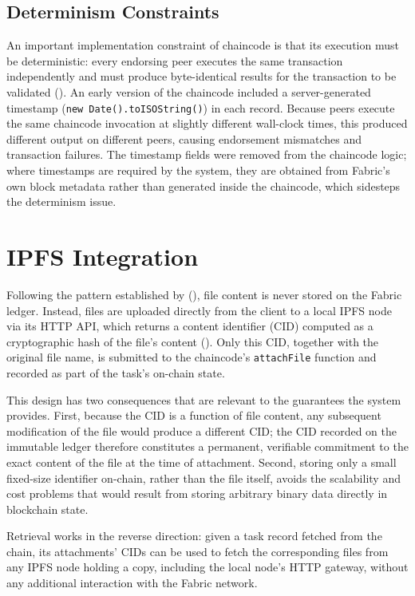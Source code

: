 \subsection{Determinism Constraints}

An important implementation constraint of chaincode is that its execution must be deterministic: every endorsing peer executes the same transaction independently and must produce byte-identical results for the transaction to be validated (). An early version of the chaincode included a server-generated timestamp (\texttt{new Date().toISOString()}) in each record. Because peers execute the same chaincode invocation at slightly different wall-clock times, this produced different output on different peers, causing endorsement mismatches and transaction failures. The timestamp fields were removed from the chaincode logic; where timestamps are required by the system, they are obtained from Fabric's own block metadata rather than generated inside the chaincode, which sidesteps the determinism issue.

\section{IPFS Integration}
\label{sec:ipfs-integration}

Following the pattern established by \textcite{adel2023} (), file content is never stored on the Fabric ledger. Instead, files are uploaded directly from the client to a local IPFS node via its HTTP API, which returns a content identifier (CID) computed as a cryptographic hash of the file's content (). Only this CID, together with the original file name, is submitted to the chaincode's \texttt{attachFile} function and recorded as part of the task's on-chain state.

This design has two consequences that are relevant to the guarantees the system provides. First, because the CID is a function of file content, any subsequent modification of the file would produce a different CID; the CID recorded on the immutable ledger therefore constitutes a permanent, verifiable commitment to the exact content of the file at the time of attachment. Second, storing only a small fixed-size identifier on-chain, rather than the file itself, avoids the scalability and cost problems that would result from storing arbitrary binary data directly in blockchain state.

Retrieval works in the reverse direction: given a task record fetched from the chain, its attachments' CIDs can be used to fetch the corresponding files from any IPFS node holding a copy, including the local node's HTTP gateway, without any additional interaction with the Fabric network.

